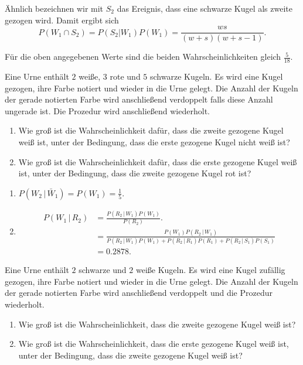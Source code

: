 Ähnlich bezeichnen wir mit $S_2$ das Ereignis, dass eine schwarze Kugel als zweite
gezogen wird. Damit ergibt sich
\begin{equation*}
    P(W_1 \cap S_2)= P(S_2 | W_1) P(W_1) = \frac{ w s }{(w+s)(w+s-1)}.
\end{equation*}

Für die oben angegebenen Werte sind die beiden Wahrscheinlichkeiten gleich
$\frac{5}{18}$.

 Eine Urne enthält $2$ weiße, $3$ rote und
$5$ schwarze Kugeln. Es wird eine Kugel gezogen, ihre Farbe notiert und wieder
in die Urne gelegt. Die Anzahl der Kugeln der gerade notierten Farbe wird
anschließend verdoppelt falls diese Anzahl ungerade ist. Die Prozedur wird
anschließend wiederholt.
\begin{enumerate}
    \item Wie groß ist die Wahrscheinlichkeit dafür, dass die zweite gezogene
        Kugel weiß ist, unter der Bedingung, dass die erste gezogene Kugel
        nicht weiß ist?

    \item Wie groß ist die Wahrscheinlichkeit dafür, dass die erste gezogene Kugel
        weiß ist, unter der Bedingung, dass die zweite gezogene Kugel rot ist?
\end{enumerate}

\solution
\begin{enumerate}
    \item $P(W_2 \,|\, \bar W_1) = P(W_1) = \frac{1}{5}$.
    \item \begin{align*}
            P(W_1 \,|\, R_2) &= \frac{  P( R_2 \,|\, W_1 ) P( W_1 ) }{ P(R_2) }. \\
            &= \frac{ P(W_1) P( R_2 \,|\, W_1)  }{ P(R_2\,|\, W_1) P(W_1) + P( R_2 \,|\, R_1 ) P(R_1) + P(R_2 \,|\, S_1) P(S_1)  } \\
            &= 0.2878.
        \end{align*}
\end{enumerate}


 Eine Urne
enthält $2$ schwarze und $2$ weiße Kugeln. Es wird eine Kugel zufällig gezogen,
ihre Farbe notiert und wieder in die Urne gelegt. Die Anzahl der Kugeln der gerade notierten
Farbe wird anschließend verdoppelt und die Prozedur wiederholt. 
\begin{enumerate}
    \item Wie groß ist die Wahrscheinlichkeit, dass die zweite gezogene Kugel weiß ist?
    \item Wie groß ist die Wahrscheinlichkeit, dass die erste gezogene Kugel
        weiß ist, unter der Bedingung, dass die zweite gezogene Kugel weiß ist?
\end{enumerate}

